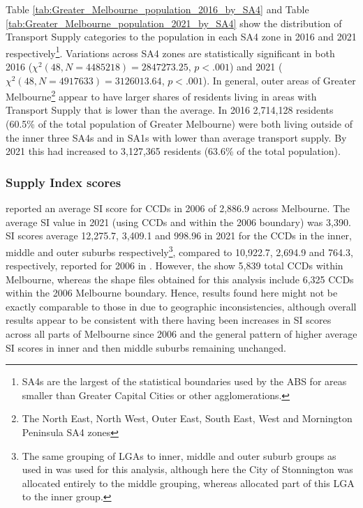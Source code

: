 \documentclass[preprint, 3p,
authoryear]{elsarticle} %
\begin{document}
Table \ref{tab:Greater_Melbourne_population_2016_by_SA4} and Table
\ref{tab:Greater_Melbourne_population_2021_by_SA4} show the distribution
of Transport Supply categories to the population in each SA4 zone in
2016 and 2021 respectively\footnote{SA4s are the largest of the
  statistical boundaries used by the ABS for areas smaller than Greater
  Capital Cities or other agglomerations.}. Variations across SA4 zones
are statistically significant in both 2016
(\(\chi^2(48, N = 4485218) = 2847273.25\), \(p < .001\)) and 2021
(\(\chi^2(48, N = 4917633) = 3126013.64\), \(p < .001\)). In general,
outer areas of Greater Melbourne\footnote{The North East, North West,
  Outer East, South East, West and Mornington Peninsula SA4 zones}
appear to have larger shares of residents living in areas with Transport
Supply that is lower than the average. In 2016 2,714,128 residents
(60.5\% of the total population of Greater Melbourne) were both living
outside of the inner three SA4s and in SA1s with lower than average
transport supply. By 2021 this had increased to 3,127,365 residents
(63.6\% of the total population).

\hypertarget{supply-index-scores}{%
\subsubsection{Supply Index scores}\label{supply-index-scores}}

\citet{currie2010identifying} reported an average SI score for CCDs in
2006 of 2,886.9 across Melbourne. The average SI value in 2021 (using
CCDs and within the 2006 boundary) was 3,390. SI scores average
12,275.7, 3,409.1 and 998.96 in 2021 for the CCDs in the inner, middle
and outer suburbs respectively\footnote{The same grouping of LGAs to
  inner, middle and outer suburb groups as used in
  \citet{currie2010identifying} was used for this analysis, although
  here the City of Stonnington was allocated entirely to the middle
  grouping, whereas \citet{currie2010identifying} allocated part of this
  LGA to the inner group.}, compared to 10,922.7, 2,694.9 and 764.3,
respectively, reported for 2006 in \citet{currie2010identifying}.
However, the \citet{currie2010identifying} show 5,839 total CCDs within
Melbourne, whereas the shape files obtained for this analysis include
6,325 CCDs within the 2006 Melbourne boundary. Hence, results found here
might not be exactly comparable to those in
\citet{currie2010identifying} due to geographic inconsistencies,
although overall results appear to be consistent with there having been
increases in SI scores across all parts of Melbourne since 2006 and the
general pattern of higher average SI scores in inner and then middle
suburbs remaining unchanged.
\end{document}
